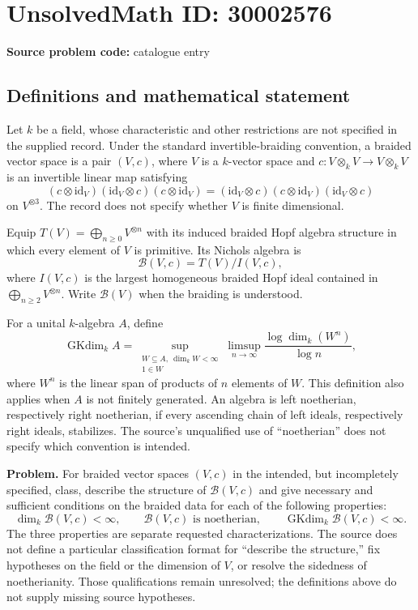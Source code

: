 \documentclass[11pt]{article}
\begin{document}
\section*{UnsolvedMath ID: 30002576}
\textbf{Source problem code:} catalogue entry
\subsection{Definitions and mathematical statement}
Let \(k\) be a field, whose characteristic and other restrictions are not specified in the supplied record. Under the standard invertible-braiding convention, a braided vector space is a pair \((V,c)\), where \(V\) is a \(k\)-vector space and \(c:V\otimes_k V\to V\otimes_k V\) is an invertible linear map satisfying
\[
(c\otimes\mathrm{id}_V)(\mathrm{id}_V\otimes c)(c\otimes\mathrm{id}_V)
=
(\mathrm{id}_V\otimes c)(c\otimes\mathrm{id}_V)(\mathrm{id}_V\otimes c)
\]
on \(V^{\otimes 3}\). The record does not specify whether \(V\) is finite dimensional.

Equip \(T(V)=\bigoplus_{n\geq 0}V^{\otimes n}\) with its induced braided Hopf algebra structure in which every element of \(V\) is primitive. Its Nichols algebra is
\[
\mathcal B(V,c)=T(V)/I(V,c),
\]
where \(I(V,c)\) is the largest homogeneous braided Hopf ideal contained in \(\bigoplus_{n\geq 2}V^{\otimes n}\). Write \(\mathcal B(V)\) when the braiding is understood.

For a unital \(k\)-algebra \(A\), define
\[
\operatorname{GKdim}_k A
=
\sup_{\substack{W\subseteq A,\ \dim_k W<\infty\\1\in W}}
\limsup_{n\to\infty}\frac{\log\dim_k(W^n)}{\log n},
\]
where \(W^n\) is the linear span of products of \(n\) elements of \(W\). This definition also applies when \(A\) is not finitely generated. An algebra is left noetherian, respectively right noetherian, if every ascending chain of left ideals, respectively right ideals, stabilizes. The source's unqualified use of ``noetherian'' does not specify which convention is intended.

\textbf{Problem.} For braided vector spaces \((V,c)\) in the intended, but incompletely specified, class, describe the structure of \(\mathcal B(V,c)\) and give necessary and sufficient conditions on the braided data for each of the following properties:
\[
\dim_k\mathcal B(V,c)<\infty,
\qquad
\mathcal B(V,c)\text{ is noetherian},
\qquad
\operatorname{GKdim}_k\mathcal B(V,c)<\infty.
\]
The three properties are separate requested characterizations. The source does not define a particular classification format for ``describe the structure,'' fix hypotheses on the field or the dimension of \(V\), or resolve the sidedness of noetherianity. Those qualifications remain unresolved; the definitions above do not supply missing source hypotheses.
\end{document}
